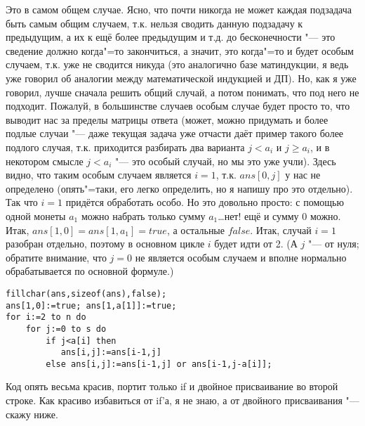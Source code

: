 Это в самом общем случае. Ясно, что почти никогда не может каждая подзадача быть самым общим 
случаем, т.к. нельзя сводить данную подзадачу к предыдущим, а их к ещё более предыдущим и т.д. до 
бесконечности "--- это сведение должно когда"=то закончиться, а значит, это когда"=то и будет 
особым случаем, т.к. уже не сводится никуда (это аналогично базе матиндукции, я ведь уже говорил об 
аналогии между математической индукцией и ДП). Но, как я уже говорил, лучше сначала решить общий 
случай, а потом понимать, что под него не подходит. Пожалуй, в большинстве случаев особым случае 
будет просто то, что выводит нас за пределы матрицы ответа {\footnotesize (может, можно придумать и более подлые 
случаи "--- даже текущая задача уже отчасти даёт пример такого более подлого случая, т.к. приходится 
разбирать два варианта $j<a_i$ и $j\geq a_i$, и в некотором смысле $j<a_i$ "--- это особый случай, 
но мы это уже учли)}. Здесь видно, что таким особым случаем является $i=1$, т.к. $ans[0,j]$ у нас 
не определено (опять"=таки, его легко определить, но я напишу про это отдельно). Так что $i=1$ 
придётся обработать особо. Но это довольно просто: с помощью одной монеты $a_1$ можно набрать 
только сумму $a_1$\dots нет! ещё и сумму 0 можно. Итак, $ans[1,0]=ans[1,a_1]=true$, а остальные 
$false$. Итак, случай $i=1$ разобран отдельно, поэтому в основном цикле $i$ будет идти от 2. (А $j$ 
"--- от нуля; обратите внимание, что $j=0$ не является особым случаем и вполне нормально 
обрабатывается по основной формуле.)
\begin{codesampleo}\begin{verbatim}
fillchar(ans,sizeof(ans),false);
ans[1,0]:=true; ans[1,a[1]]:=true;
for i:=2 to n do
    for j:=0 to s do
        if j<a[i] then
           ans[i,j]:=ans[i-1,j]
        else ans[i,j]:=ans[i-1,j] or ans[i-1,j-a[i]];
\end{verbatim}\end{codesampleo}
Код опять весьма красив, портит только if и двойное присваивание во второй строке. Как красиво избавиться 
от if'а, я не знаю, а от двойного присваивания "--- скажу ниже.

